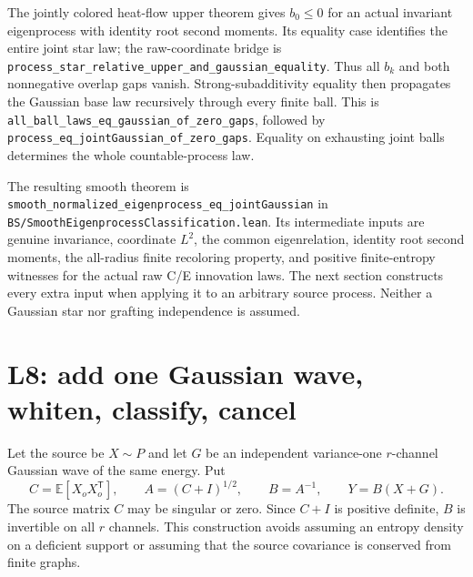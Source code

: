 \documentclass[11pt]{article}
\newcommand{\E}{\mathbb E}
\newcommand{\lean}[1]{{\small\nolinkurl{#1}}}
\begin{document}
The jointly colored heat-flow upper theorem gives $b_0\leq0$ for an actual
invariant eigenprocess with identity root second moments. Its equality
case identifies the entire joint star law; the raw-coordinate bridge is
\lean{process_star_relative_upper_and_gaussian_equality}. Thus all $b_k$
and both nonnegative overlap gaps vanish. Strong-subadditivity equality
then propagates the Gaussian base law recursively through every finite
ball. This is \lean{all_ball_laws_eq_gaussian_of_zero_gaps}, followed by
\lean{process_eq_jointGaussian_of_zero_gaps}. Equality on exhausting joint
balls determines the whole countable-process law.

The resulting smooth theorem is
\lean{smooth_normalized_eigenprocess_eq_jointGaussian} in
\lean{BS/SmoothEigenprocessClassification.lean}. Its intermediate inputs
are genuine invariance, coordinate $L^2$, the common eigenrelation, identity
root second moments, the all-radius finite recoloring property, and positive
finite-entropy witnesses for the actual raw C/E innovation laws. The next
section constructs every extra input when applying it to an arbitrary
source process. Neither a Gaussian star nor grafting independence is
assumed.

\section{L8: add one Gaussian wave, whiten, classify, cancel}
Let the source be $X\sim P$ and let $G$ be an independent variance-one
$r$-channel Gaussian wave of the same energy. Put
\[
 C=\E[X_oX_o^{\mathsf T}],\qquad
 A=(C+I)^{1/2},\qquad B=A^{-1},\qquad Y=B(X+G).
\]
The source matrix $C$ may be singular or zero. Since $C+I$ is positive
definite, $B$ is invertible on all $r$ channels. This construction avoids
assuming an entropy density on a deficient support or assuming that the
source covariance is conserved from finite graphs.
\end{document}
